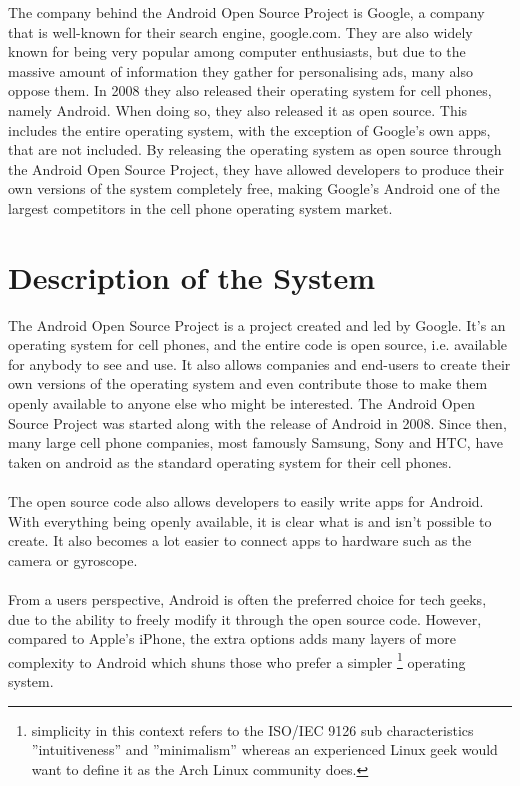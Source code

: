 \documentclass[conference]{IEEEtran}
\begin{document}

The company behind the Android Open Source Project is Google\cite{android}, a company that is well-known for their search engine, google.com. They are also widely known for being very popular among computer enthusiasts, but due to the massive amount of information they gather for personalising ads, many also oppose them. In 2008 they also released their operating system for cell phones, namely Android.\cite{android-release} When doing so, they also released it as open source.\cite{android} This includes the entire operating system, with the exception of Google's own apps, that are not included. By releasing the operating system as open source through the Android Open Source Project, they have allowed developers to produce their own versions of the system completely free, making Google's Android one of the largest competitors in the cell phone operating system market.\cite{android-market}


\section{Description of the System}
\label{system}

The Android Open Source Project is a project created and led by Google. It's an operating system for cell phones, and the entire code is open source, i.e. available for anybody to see and use. It also allows companies and end-users to create their own versions of the operating system and even contribute those to make them openly available to anyone else who might be interested.\cite{android} The Android Open Source Project was started along with the release of Android in 2008. Since then, many large cell phone companies, most famously Samsung, Sony and HTC, have taken on android as the standard operating system for their cell phones. \\
\\
The open source code also allows developers to easily write apps for Android. With everything being openly available, it is clear what is and isn't possible to create. It also becomes a lot easier to connect apps to hardware such as the camera or gyroscope.\\
\\
From a users perspective, Android is often the preferred choice for tech geeks, due to the ability to freely modify it through the open source code. However, compared to Apple's iPhone, the extra options adds many layers of more complexity to Android which shuns those who prefer a simpler \footnote{simplicity in this context refers to the ISO/IEC 9126\cite{jung2004} sub characteristics ''intuitiveness'' and ''minimalism'' whereas an experienced Linux geek would want to define it as the Arch Linux community does.\cite{archway}} operating system. 
\end{document}
